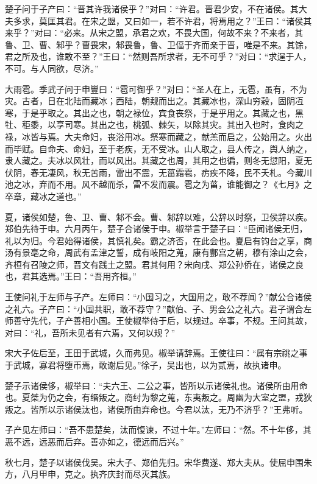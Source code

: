 \documentclass[a4paper,12pt,UTF8,twoside]{ctexbook}
\begin{document}
楚子问于子产曰：“晋其许我诸侯乎？”对曰：“许君。晋君少安，不在诸侯。其大夫多求，莫匡其君。在宋之盟，又曰如一，若不许君，将焉用之？”王曰：“诸侯其来乎？”对曰：“必来。从宋之盟，承君之欢，不畏大国，何故不来？不来者，其鲁、卫、曹、邾乎？曹畏宋，邾畏鲁，鲁、卫偪于齐而亲于晋，唯是不来。其馀，君之所及也，谁敢不至？”王曰：“然则吾所求者，无不可乎？”对曰：“求逞于人，不可。与人同欲，尽济。”

大雨雹。季武子问于申豐曰：“雹可御乎？”对曰：“圣人在上，无雹，虽有，不为灾。古者，日在北陆而藏冰；西陆，朝觌而出之。其藏冰也，深山穷穀，固阴冱寒，于是乎取之。其出之也，朝之禄位，宾食丧祭，于是乎用之。其藏之也，黑牡、秬黍，以享司寒。其出之也，桃弧、棘矢，以除其灾。其出入也时，食肉之禄，冰皆与焉。大夫命妇，丧浴用冰。祭寒而藏之，献羔而启之，公始用之。火出而毕赋。自命夫、命妇，至于老疾，无不受冰。山人取之，县人传之，舆人纳之，隶人藏之。夫冰以风壮，而以风出。其藏之也周，其用之也徧，则冬无愆阳，夏无伏阴，春无凄风，秋无苦雨，雷出不震，无菑霜雹，疠疾不降，民不夭札。今藏川池之冰，弃而不用。风不越而杀，雷不发而震。雹之为菑，谁能御之？《七月》之卒章，藏冰之道也。”

夏，诸侯如楚，鲁、卫、曹、邾不会。曹、邾辞以难，公辞以时祭，卫侯辞以疾。郑伯先待于申。六月丙午，楚子合诸侯于申。椒举言于楚子曰：“臣闻诸侯无归，礼以为归。今君始得诸侯，其慎礼矣。霸之济否，在此会也。夏启有钧台之享，商汤有景亳之命，周武有孟津之誓，成有岐阳之蒐，康有酆宫之朝，穆有涂山之会，齐桓有召陵之师，晋文有践土之盟。君其何用？宋向戌、郑公孙侨在，诸侯之良也，君其选焉。”王曰：“吾用齐桓。”

王使问礼于左师与子产。左师曰：“小国习之，大国用之，敢不荐闻？”献公合诸侯之礼六。子产曰：“小国共职，敢不荐守？”献伯、子、男会公之礼六。君子谓合左师善守先代，子产善相小国。王使椒举侍于后，以规过。卒事，不规。王问其故，对曰：“礼，吾所未见者有六焉，又何以规？”

宋大子佐后至，王田于武城，久而弗见。椒举请辞焉。王使往曰：“属有宗祧之事于武城，寡君将堕币焉，敢谢后见。”徐子，吴出也，以为贰焉，故执诸申。

楚子示诸侯侈，椒举曰：“夫六王、二公之事，皆所以示诸侯礼也。诸侯所由用命也。夏桀为仍之会，有缗叛之。商纣为黎之蒐，东夷叛之。周幽为大室之盟，戎狄叛之。皆所以示诸侯汰也，诸侯所由弃命也。今君以汰，无乃不济乎？”王弗听。

子产见左师曰：“吾不患楚矣，汰而愎谏，不过十年。”左师曰：“然。不十年侈，其恶不远，远恶而后弃。善亦如之，德远而后兴。”

秋七月，楚子以诸侯伐吴。宋大子、郑伯先归。宋华费遂、郑大夫从。使屈申围朱方，八月甲申，克之。执齐庆封而尽灭其族。
\end{document}
